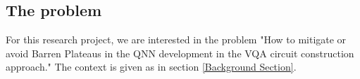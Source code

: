 \subsection{The problem}
For this research project, we are interested in the problem "How to mitigate or avoid Barren Plateaus in the QNN development in the VQA circuit construction approach." The context is given as in section \ref{Background Section}.